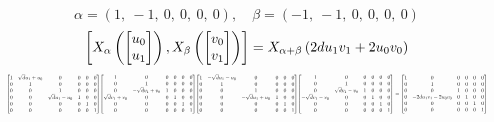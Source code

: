 \documentclass[11pt]{article}
\theoremstyle{definition}
\begin{document}
\[
\alpha = \left( 1, \  -1, \  0, \  0, \  0, \  0\right), \quad \beta = \left( -1, \  -1, \  0, \  0, \  0, \  0\right)
\]
\[
\scaletoalign{\textwidth}{\left[ X_{\alpha}\left(\left[\begin{matrix}u_{0}\\u_{1}\end{matrix}\right]\right), X_{\beta}\left(\left[\begin{matrix}v_{0}\\v_{1}\end{matrix}\right]\right) \right] = X_{\alpha + \beta}\left(2 d u_{1} v_{1} + 2 u_{0} v_{0}\right)}
\]
\[
\scaletoalign{\textwidth}{{\left[\begin{matrix}1 & \sqrt{d} u_{1} + u_{0} & 0 & 0 & 0 & 0\\0 & 1 & 0 & 0 & 0 & 0\\0 & 0 & 1 & 0 & 0 & 0\\0 & 0 & \sqrt{d} u_{1} - u_{0} & 1 & 0 & 0\\0 & 0 & 0 & 0 & 1 & 0\\0 & 0 & 0 & 0 & 0 & 1\end{matrix}\right]} {\left[\begin{matrix}1 & 0 & 0 & 0 & 0 & 0\\0 & 1 & 0 & 0 & 0 & 0\\0 & - \sqrt{d} v_{1} + v_{0} & 1 & 0 & 0 & 0\\\sqrt{d} v_{1} + v_{0} & 0 & 0 & 1 & 0 & 0\\0 & 0 & 0 & 0 & 1 & 0\\0 & 0 & 0 & 0 & 0 & 1\end{matrix}\right]} {\left[\begin{matrix}1 & - \sqrt{d} u_{1} - u_{0} & 0 & 0 & 0 & 0\\0 & 1 & 0 & 0 & 0 & 0\\0 & 0 & 1 & 0 & 0 & 0\\0 & 0 & - \sqrt{d} u_{1} + u_{0} & 1 & 0 & 0\\0 & 0 & 0 & 0 & 1 & 0\\0 & 0 & 0 & 0 & 0 & 1\end{matrix}\right]} {\left[\begin{matrix}1 & 0 & 0 & 0 & 0 & 0\\0 & 1 & 0 & 0 & 0 & 0\\0 & \sqrt{d} v_{1} - v_{0} & 1 & 0 & 0 & 0\\- \sqrt{d} v_{1} - v_{0} & 0 & 0 & 1 & 0 & 0\\0 & 0 & 0 & 0 & 1 & 0\\0 & 0 & 0 & 0 & 0 & 1\end{matrix}\right]} = {\left[\begin{matrix}1 & 0 & 0 & 0 & 0 & 0\\0 & 1 & 0 & 0 & 0 & 0\\0 & 0 & 1 & 0 & 0 & 0\\0 & - 2 d u_{1} v_{1} - 2 u_{0} v_{0} & 0 & 1 & 0 & 0\\0 & 0 & 0 & 0 & 1 & 0\\0 & 0 & 0 & 0 & 0 & 1\end{matrix}\right]}}
\]
\end{document}
